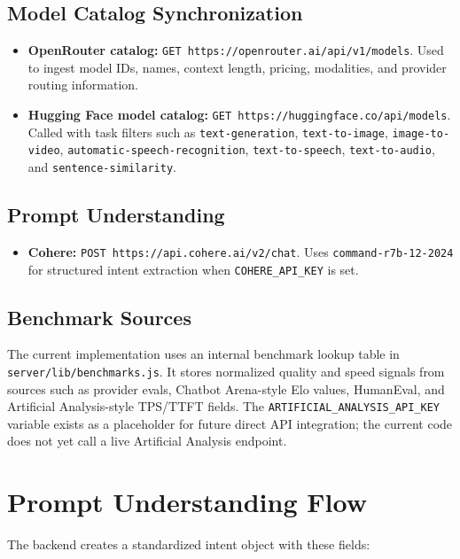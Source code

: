\documentclass[11pt]{article}
\begin{document}
\subsection{Model Catalog Synchronization}

\begin{itemize}[leftmargin=*]
  \item \textbf{OpenRouter catalog:} \texttt{GET https://openrouter.ai/api/v1/models}. Used to ingest model IDs, names, context length, pricing, modalities, and provider routing information.
  \item \textbf{Hugging Face model catalog:} \texttt{GET https://huggingface.co/api/models}. Called with task filters such as \texttt{text-generation}, \texttt{text-to-image}, \texttt{image-to-video}, \texttt{automatic-speech-recognition}, \texttt{text-to-speech}, \texttt{text-to-audio}, and \texttt{sentence-similarity}.
\end{itemize}

\subsection{Prompt Understanding}

\begin{itemize}[leftmargin=*]
  \item \textbf{Cohere:} \texttt{POST https://api.cohere.ai/v2/chat}. Uses \texttt{command-r7b-12-2024} for structured intent extraction when \texttt{COHERE\_API\_KEY} is set.
\end{itemize}

\subsection{Benchmark Sources}

The current implementation uses an internal benchmark lookup table in \texttt{server/lib/benchmarks.js}. It stores normalized quality and speed signals from sources such as provider evals, Chatbot Arena-style Elo values, HumanEval, and Artificial Analysis-style TPS/TTFT fields. The \texttt{ARTIFICIAL\_ANALYSIS\_API\_KEY} variable exists as a placeholder for future direct API integration; the current code does not yet call a live Artificial Analysis endpoint.

\section{Prompt Understanding Flow}

The backend creates a standardized intent object with these fields:
\end{document}
